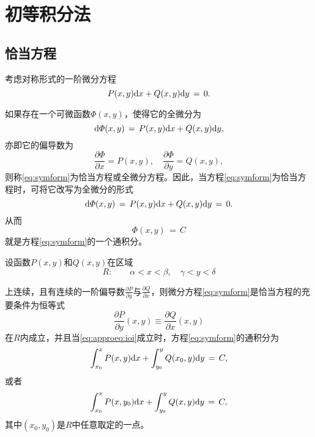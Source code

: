 \section{初等积分法}
\subsection{恰当方程}
考虑对称形式的一阶微分方程
\begin{equation}\label{eq:symform}
P(x,y)\mathrm{d} x+Q(x,y)\mathrm{d} y\,=\,0.
\end{equation}\par
如果存在一个可微函数$\varPhi(x,y)$，使得它的全微分为
$$\mathrm{d}\varPhi(x,y)\,=\,P(x,y)\mathrm{d} x+Q(x,y)\mathrm{d} y,$$
亦即它的偏导数为
\begin{equation}\label{eq:phipartialdiff}
\frac{\partial\varPhi}{\partial x}=P(x,y),\quad\frac{\partial\varPhi}{\partial y}=Q(x,y),
\end{equation}
则称\eqref{eq:symform}为{\heiti 恰当方程}或{\heiti 全微分方程}。因此，当方程\eqref{eq:symform}为恰当方程时，可将它改写为全微分的形式
\begin{equation*}
\mathrm{d}\varPhi(x,y)\,=\,P(x,y)\mathrm{d} x+Q(x,y)\mathrm{d} y\,=\,0.
\end{equation*}
从而
\begin{equation*}
\varPhi(x,y)\,=\,C
\end{equation*}
就是方程\ref{eq:symform}的一个通积分。
\begin{theo}\label{theo:approeq}%
设函数$P(x,y)$和$Q(x,y)$在区域
$$R:\quad\quad \alpha<x<\beta,\quad\gamma<y<\delta$$

上连续，且有连续的一阶偏导数$\frac{\partial P}{\partial y}$与$\frac{\partial Q}{\partial x}$，则微分方程\eqref{eq:symform}是恰当方程的充要条件为恒等式
\begin{equation}\label{eq:approeq:ioi}
\frac{\partial P}{\partial y}(x,y)\equiv\frac{\partial Q}{\partial x}(x,y)
\end{equation}
在$R$内成立，并且当\eqref{eq:approeq:ioi}成立时，方程\eqref{eq:symform}的通积分为
$$\int_{x_0}^xP(x,y)\mathrm{d} x+\int_{y_0}^yQ(x_0,y)\mathrm{d} y\,=\,C,$$
或者
$$\int_{x_0}^xP(x,y_0)\mathrm{d} x+\int_{y_0}^yQ(x,y)\mathrm{d} y\,=\,C,$$
其中$(x_0,y_0)$是$R$中任意取定的一点。
\end{theo}\par
